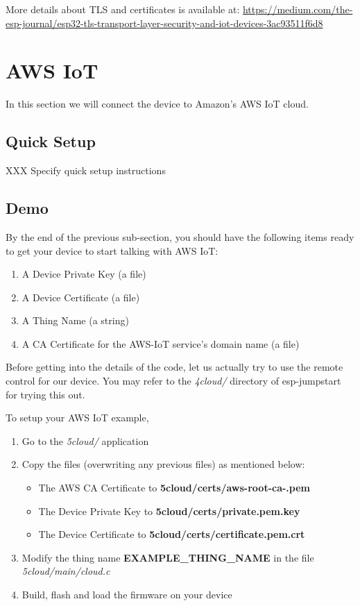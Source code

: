 \documentclass[11pt,fleqn]{book} %
\begin{document}
More details about TLS and certificates is available at: \url{https://medium.com/the-esp-journal/esp32-tls-transport-layer-security-and-iot-devices-3ac93511f6d8}


\section{AWS IoT}
In this section we will connect the device to Amazon's AWS IoT cloud. 

\subsection{Quick Setup}
XXX Specify quick setup instructions

\subsection{Demo}
By the end of the previous sub-section, you should have the following items ready to get your device to start talking with AWS IoT:
\begin{enumerate}
    \item A Device Private Key (a file)
    \item A Device Certificate (a file)
    \item A Thing Name (a string)
    \item A CA Certificate for the AWS-IoT service's domain name (a file)
\end{enumerate}

Before getting into the details of the code, let us actually try to use the remote control for our device.
You may refer to the \textit{4cloud/} directory of esp-jumpstart for trying this out.

To setup your AWS IoT example, 
\begin{enumerate}
    \item Go to the \textit{5cloud/} application
    \item Copy the files (overwriting any previous files) as mentioned below:
    \begin{itemize}
        \item The AWS CA Certificate to \textbf{5cloud/certs/aws-root-ca-.pem}
        \item The Device Private Key to \textbf{5cloud/certs/private.pem.key}
        \item The Device Certificate to \textbf{5cloud/certs/certificate.pem.crt}
    \end{itemize}
    \item Modify the thing name \textbf{EXAMPLE\_THING\_NAME} in the file \textit{5cloud/main/cloud.c}
    \item Build, flash and load the firmware on your device
\end{enumerate}
\end{document}
